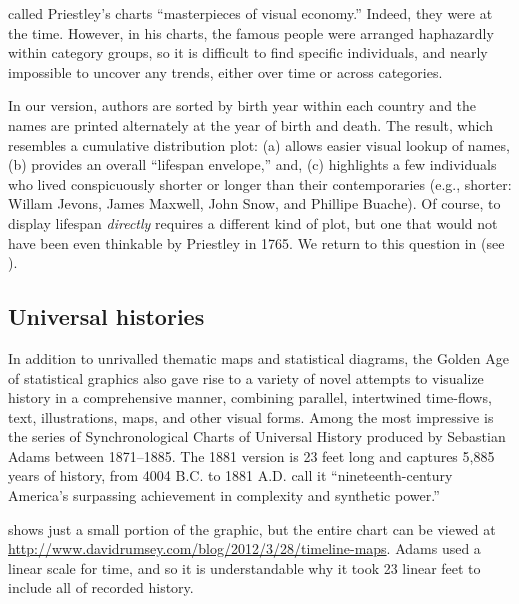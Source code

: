 \citet[p. 117]{RosenbergGrafton:2010} called Priestley's charts ``masterpieces of visual economy.'' Indeed, they were at the time.  However, in his charts, the famous people were arranged haphazardly within category groups, so it is difficult to find specific individuals, and nearly impossible to uncover any trends, either over time or across categories. 

In our version, authors are sorted by birth year within each country and the names are printed alternately at the year of birth and death. The result, which resembles a cumulative distribution plot: (a) allows easier visual lookup of names, (b) provides an overall ``lifespan envelope,'' and, (c) highlights a few individuals who lived conspicuously shorter or longer than their contemporaries (e.g., shorter: Willam Jevons,  James Maxwell, John Snow, and Phillipe Buache). Of course, to display lifespan \emph{directly} requires a different kind of plot, but one that would not have been even thinkable by Priestley in 1765.  We return to this question in  (see ).

\subsection{Universal histories}
In addition to unrivalled thematic maps and statistical diagrams, the Golden Age of statistical graphics also gave rise to a variety of novel attempts to visualize history in a comprehensive manner, combining parallel, intertwined time-flows, text, illustrations, maps, and other visual forms. Among the most impressive is the series of Synchronological Charts of Universal History produced by Sebastian Adams between 1871--1885. The 1881 version is 23 feet long and captures 5,885 years of history, from 4004 B.C. to 1881 A.D. \citet[p. 172]{RosenbergGrafton:2010} call it ``nineteenth-century America's surpassing achievement in complexity and synthetic power.'' 

 shows just a small portion of the graphic, but the entire chart can be viewed at \url{http://www.davidrumsey.com/blog/2012/3/28/timeline-maps}.  Adams used a linear scale for time, and so it is understandable why it took 23 linear feet to include all of recorded history.

